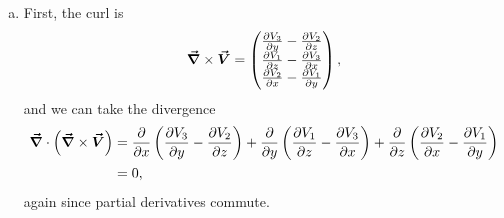 \documentclass[12pt]{article} %
\begin{document}
\begin{solution}
\begin{enumerate}[(a)]
        \item First, the curl is
        \[
        \boldsymbol{\vec{\nabla}} \times \boldsymbol{\vec{V}} = \begin{pmatrix} \frac{\partial V_3}{\partial y} - \frac{\partial V_2}{\partial z} \\ \frac{\partial V_1}{\partial z} - \frac{\partial V_3}{\partial x} \\ \frac{\partial V_2}{\partial x} - \frac{\partial V_1}{\partial y} \end{pmatrix},
        \]
        and we can take the divergence
        \begin{align*}
            \boldsymbol{\vec{\nabla}} \cdot \left(\boldsymbol{\vec{\nabla}} \times \boldsymbol{\vec{V}}\right) &= \frac{\partial}{\partial x} \left(\frac{\partial V_3}{\partial y} - \frac{\partial V_2}{\partial z}\right) +  \frac{\partial}{\partial y} \left(\frac{\partial V_1}{\partial z} - \frac{\partial V_3}{\partial x}\right) +  \frac{\partial}{\partial z} \left(\frac{\partial V_2}{\partial x} - \frac{\partial V_1}{\partial y}\right)\\
            &= 0,
        \end{align*}
        again since partial derivatives commute.
    \end{enumerate}
\end{solution}
\end{document}
